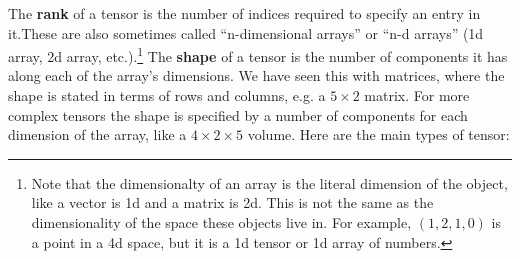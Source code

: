 The \textbf{rank} of a  tensor is the number of indices required to specify an entry in it.These are also sometimes called ``n-dimensional arrays'' or ``n-d arrays'' (1d array, 2d array, etc.).\footnote{Note that the dimensionalty of an array is the literal dimension of the object, like a vector is 1d and a matrix is 2d. This is not the same as the dimensionality of the space these objects live in. For example, $(1,2,1,0)$ is a point in a 4d space, but it is a 1d tensor or 1d array of numbers.} The \textbf{shape} of a tensor is the number of components it has along each of the array's dimensions. We have seen this with matrices, where the shape is stated in terms of rows and columns, e.g. a $5 \times 2$ matrix. For more complex tensors the shape is specified by a number of components for each dimension of the array, like a $4 \times 2 \times 5$ volume. Here are the main types of tensor:

